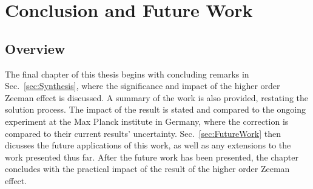 \chapter{Conclusion and Future Work}\label{sec:Conclusion}
    \section{Overview}
        The final chapter of this thesis begins with concluding remarks in Sec.~\ref{sec:Synthesis}, where the significance and impact of the higher order Zeeman effect is discussed. A summary of the work is also provided, restating the solution process. The impact of the result is stated and compared to the ongoing experiment at the Max Planck institute in Germany, where the correction is compared to their current results' uncertainty. Sec.~\ref{sec:FutureWork} then dicusses the future applications of this work, as well as any extensions to the work presented thus far. After the future work has been presented, the chapter concludes with the practical impact of the result of the higher order Zeeman effect.
